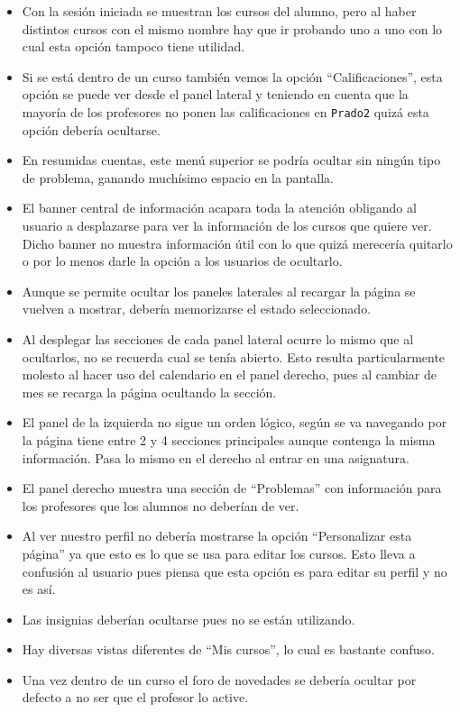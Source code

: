 \begin{itemize}
\item Con la sesión iniciada se muestran los cursos del alumno, pero al haber distintos cursos con el mismo nombre hay que ir probando uno a uno con lo cual esta opción tampoco tiene utilidad.
\item Si se está dentro de un curso también vemos la opción ``Calificaciones'', esta opción se puede ver desde el panel lateral y teniendo en cuenta que la mayoría de los profesores no ponen las calificaciones en \texttt{Prado2} quizá esta opción debería ocultarse.
\item En resumidas cuentas, este menú superior se podría ocultar sin ningún tipo de problema, ganando muchísimo espacio en la pantalla.
\item El banner central de información acapara toda la atención obligando al usuario a desplazarse para ver la información de los cursos que quiere ver. Dicho banner no muestra información útil con lo que quizá merecería quitarlo o por lo menos darle la opción a los usuarios de ocultarlo.
\item Aunque se permite ocultar los paneles laterales al recargar la página se vuelven a mostrar, debería memorizarse el estado seleccionado.
\item Al desplegar las secciones de cada panel lateral ocurre lo mismo que al ocultarlos, no se recuerda cual se tenía abierto. Esto resulta particularmente molesto al hacer uso del calendario en el panel derecho, pues al cambiar de mes se recarga la página ocultando la sección.
\item El panel de la izquierda no sigue un orden lógico, según se va navegando por la página tiene entre 2 y 4 secciones principales aunque contenga la misma información. Pasa lo mismo en el derecho al entrar en una asignatura.
\item El panel derecho muestra una sección de ``Problemas'' con información para los profesores que los alumnos no deberían de ver.
\item Al ver nuestro perfil no debería mostrarse la opción ``Personalizar esta página'' ya que esto es lo que se usa para editar los cursos. Esto lleva a confusión al usuario pues piensa que esta opción es para editar su perfil y no es así.
\item Las insignias deberían ocultarse pues no se están utilizando.
\item Hay diversas vistas diferentes de ``Mis cursos'', lo cual es bastante confuso.
\item Una vez dentro de un curso el foro de novedades se debería ocultar por defecto a no ser que el profesor lo active.

\end{itemize}
